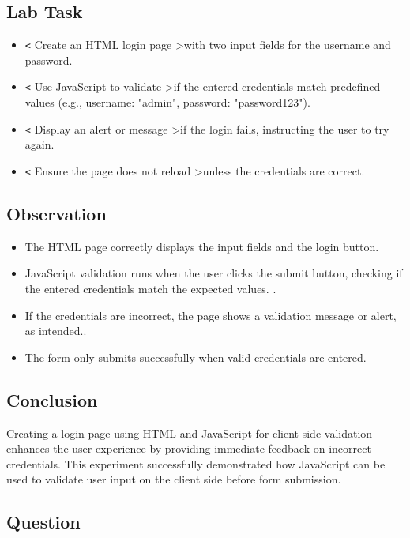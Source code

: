 \documentclass[a4paper,9pt]{article}
\begin{document}
\subsection{Lab Task}

\begin{itemize}
	\item \texttt{\textless} Create an HTML login page \textgreater with two input fields for the username and password.
	\item \texttt{\textless} Use JavaScript to validate \textgreater if the entered credentials match predefined values (e.g., username: "admin", password: "password123").
	\item \texttt{\textless} Display an alert or message \textgreater if the login fails, instructing the user to try again.
	
	\item \texttt{\textless} Ensure the page does not reload \textgreater unless the credentials are correct.
	
\end{itemize}

\subsection{Observation}
\begin{itemize}
	\item The HTML page correctly displays the input fields and the login button.
	
	
	\item JavaScript validation runs when the user clicks the submit button, checking if the entered credentials match the expected values.
	.
	\item If the credentials are incorrect, the page shows a validation message or alert, as intended..
	\item The form only submits successfully when valid credentials are entered.
\end{itemize}
\subsection{Conclusion}
Creating a login page using HTML and JavaScript for client-side validation enhances the user experience by providing immediate feedback on incorrect credentials. This experiment successfully demonstrated how JavaScript can be used to validate user input on the client side before form submission.
\subsection{Question}
\end{document}
